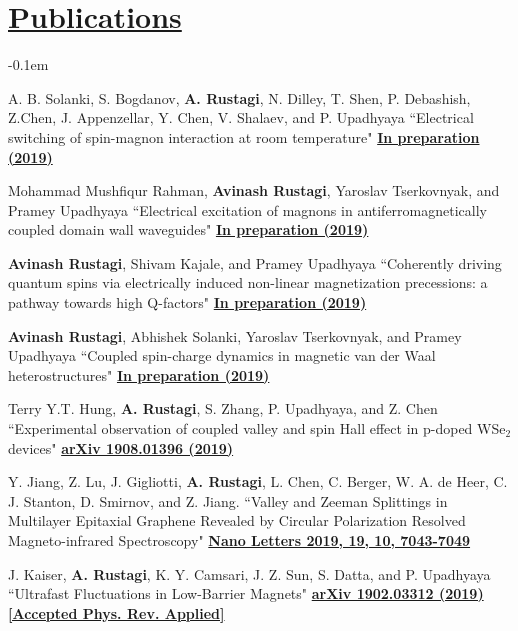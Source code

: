 \documentclass[11pt]{article}
\begin{document}
\section*{\underline{Publications}}
\begin{etaremune}
\itemsep-0.1em
\item A. B. Solanki, S. Bogdanov, {\bf A. Rustagi}, N. Dilley, T. Shen, P. Debashish, Z.Chen, J. Appenzellar, Y. Chen, V. Shalaev, and P. Upadhyaya ``Electrical switching of spin-magnon interaction at room temperature" \href{}{\bf In preparation (2019)}

\item Mohammad Mushfiqur Rahman, {\bf Avinash Rustagi}, Yaroslav Tserkovnyak, and Pramey Upadhyaya ``Electrical excitation of magnons in antiferromagnetically coupled domain wall waveguides" \href{}{\bf In preparation (2019)}

 \item {\bf Avinash Rustagi}, Shivam Kajale, and Pramey Upadhyaya ``Coherently driving quantum spins via electrically induced non-linear magnetization precessions: a pathway towards high Q-factors" \href{}{\bf In preparation (2019)}
 
\item {\bf Avinash Rustagi}, Abhishek Solanki, Yaroslav Tserkovnyak, and Pramey Upadhyaya ``Coupled spin-charge dynamics in magnetic van der Waal heterostructures" \href{}{\bf In preparation (2019)}
 
\item Terry Y.T. Hung, {\bf A. Rustagi}, S. Zhang, P. Upadhyaya, and Z. Chen ``Experimental observation of coupled valley and spin Hall effect in p-doped WSe$_2$ devices" \href{http://arxiv.org/abs/1908.01396}{\bf arXiv 1908.01396 (2019)}

\item Y. Jiang, Z. Lu, J. Gigliotti, {\bf A. Rustagi}, L. Chen, C. Berger, W. A. de Heer, C. J. Stanton, D. Smirnov, and Z. Jiang. ``Valley and Zeeman Splittings in Multilayer Epitaxial Graphene Revealed by Circular Polarization Resolved Magneto-infrared Spectroscopy" \href{https://doi.org/10.1021/acs.nanolett.9b02505}{\bf Nano Letters 2019, 19, 10, 7043-7049} 

\item J. Kaiser, {\bf A. Rustagi}, K. Y. Camsari, J. Z. Sun, S. Datta, and P. Upadhyaya ``Ultrafast Fluctuations in Low-Barrier Magnets" \href{http://arxiv.org/abs/1902.03312}{\bf arXiv 1902.03312 (2019) [Accepted Phys. Rev. Applied]}


\end{etaremune}
\end{document}
